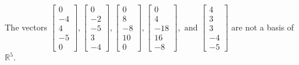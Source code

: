\begin{exercise}
\begin{exerciseStatement}
  \end{exerciseStatement}
  \begin{exerciseAnswer}
   The vectors \(\left[\begin{array}{r}
0 \\
-4 \\
4 \\
-5 \\
0
\end{array}\right] , \left[\begin{array}{r}
0 \\
-2 \\
-5 \\
3 \\
-4
\end{array}\right] , \left[\begin{array}{r}
0 \\
8 \\
-8 \\
10 \\
0
\end{array}\right] , \left[\begin{array}{r}
0 \\
4 \\
-18 \\
16 \\
-8
\end{array}\right] , \text{ and } \left[\begin{array}{r}
4 \\
3 \\
3 \\
-4 \\
-5
\end{array}\right]\) 
  	 are not  a basis of \(\mathbb{R}^5\).
  


  \end{exerciseAnswer}
\end{exercise}